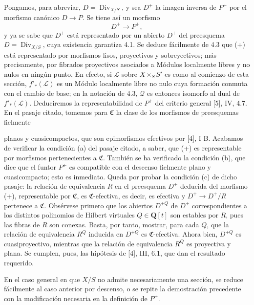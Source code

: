 Pongamos, para abreviar, $D=\operatorname{Div}_{X/S}$, y sea $D^+$ la imagen
inversa de $P^+$ por el morfismo canónico $D\longrightarrow P$. Se tiene así un
morfismo
\begin{equation}
D^+\longrightarrow P^+,
\tag{+}
\end{equation}
y ya se sabe que $D^+$ está representado por un abierto $D^+$ del preesquema
$D=\operatorname{Div}_{X/S}$, cuya existencia garantiza 4.1. Se deduce
fácilmente de 4.3 que (+) está representado por morfismos lisos, proyectivos y
sobreyectivos; más precisamente, por fibrados proyectivos asociados a Módulos
localmente libres y no nulos en ningún punto. En efecto, si $\mathcal L$ sobre
$X\times_SS'$ es como al comienzo de esta sección, $f'_*(\mathcal L)$ es un
Módulo localmente libre no nulo cuya formación conmuta con el cambio de base;
en la notación de 4.3, $\mathcal Q$ es entonces isomorfo al dual de
$f'_*(\mathcal L)$. Deduciremos la representabilidad de $P^+$ del criterio
general [5], IV, 4.7. En el pasaje citado, tomemos para $\mathfrak C$ la clase
de los morfismos de preesquemas fielmente

planos y cuasicompactos, que son epimorfismos efectivos por [4], I B. Acabamos
de verificar la condición (a) del pasaje citado, a saber, que (+) es
representable por morfismos pertenecientes a $\mathfrak C$. También se ha
verificado la condición (b), que dice que el funtor $P^+$ es compatible con el
descenso fielmente plano y cuasicompacto; esto es inmediato. Queda por probar
la condición (c) de dicho pasaje: la relación de equivalencia $R$ en el
preesquema $D^+$ deducida del morfismo (+), representable por $\mathfrak C$, es
$\mathfrak C$-efectiva, es decir, es efectiva y
$D^+\longrightarrow D^+/R$ pertenece a $\mathfrak C$. Obsérvese primero que
los abiertos $D^{+Q}$ de $D^+$ correspondientes a los distintos polinomios de
Hilbert virtuales $Q\in\mathbf Q[t]$ son estables por $R$, pues las fibras de
$R$ son conexas. Basta, por tanto, mostrar, para cada $Q$, que la relación de
equivalencia $R^Q$ inducida en $D^{+Q}$ es $\mathfrak C$-efectiva. Ahora bien,
$D^{+Q}$ es cuasiproyectivo, mientras que la relación de equivalencia $R^Q$ es
proyectiva y plana. Se cumplen, pues, las hipótesis de [4], III, 6.1, que dan el
resultado requerido.

En el caso general en que $X/S$ no admite necesariamente una sección, se reduce
fácilmente al caso anterior por descenso, o se repite la demostración precedente
con la modificación necesaria en la definición de $P^+$.

